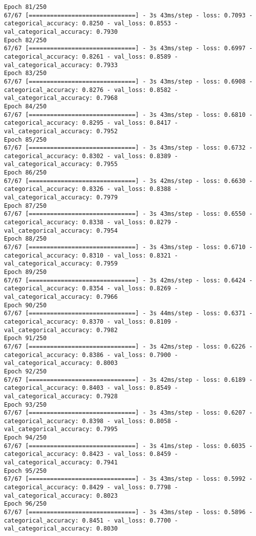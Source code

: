 \begin{lstlisting}
Epoch 81/250
67/67 [==============================] - 3s 43ms/step - loss: 0.7093 - categorical_accuracy: 0.8250 - val_loss: 0.8553 - val_categorical_accuracy: 0.7930
Epoch 82/250
67/67 [==============================] - 3s 43ms/step - loss: 0.6997 - categorical_accuracy: 0.8261 - val_loss: 0.8589 - val_categorical_accuracy: 0.7933
Epoch 83/250
67/67 [==============================] - 3s 43ms/step - loss: 0.6908 - categorical_accuracy: 0.8276 - val_loss: 0.8582 - val_categorical_accuracy: 0.7968
Epoch 84/250
67/67 [==============================] - 3s 43ms/step - loss: 0.6810 - categorical_accuracy: 0.8295 - val_loss: 0.8417 - val_categorical_accuracy: 0.7952
Epoch 85/250
67/67 [==============================] - 3s 43ms/step - loss: 0.6732 - categorical_accuracy: 0.8302 - val_loss: 0.8389 - val_categorical_accuracy: 0.7955
Epoch 86/250
67/67 [==============================] - 3s 42ms/step - loss: 0.6630 - categorical_accuracy: 0.8326 - val_loss: 0.8388 - val_categorical_accuracy: 0.7979
Epoch 87/250
67/67 [==============================] - 3s 43ms/step - loss: 0.6550 - categorical_accuracy: 0.8338 - val_loss: 0.8279 - val_categorical_accuracy: 0.7954
Epoch 88/250
67/67 [==============================] - 3s 43ms/step - loss: 0.6710 - categorical_accuracy: 0.8310 - val_loss: 0.8321 - val_categorical_accuracy: 0.7959
Epoch 89/250
67/67 [==============================] - 3s 42ms/step - loss: 0.6424 - categorical_accuracy: 0.8354 - val_loss: 0.8269 - val_categorical_accuracy: 0.7966
Epoch 90/250
67/67 [==============================] - 3s 44ms/step - loss: 0.6371 - categorical_accuracy: 0.8370 - val_loss: 0.8109 - val_categorical_accuracy: 0.7982
Epoch 91/250
67/67 [==============================] - 3s 42ms/step - loss: 0.6226 - categorical_accuracy: 0.8386 - val_loss: 0.7900 - val_categorical_accuracy: 0.8003
Epoch 92/250
67/67 [==============================] - 3s 42ms/step - loss: 0.6189 - categorical_accuracy: 0.8403 - val_loss: 0.8549 - val_categorical_accuracy: 0.7928
Epoch 93/250
67/67 [==============================] - 3s 43ms/step - loss: 0.6207 - categorical_accuracy: 0.8398 - val_loss: 0.8058 - val_categorical_accuracy: 0.7995
Epoch 94/250
67/67 [==============================] - 3s 41ms/step - loss: 0.6035 - categorical_accuracy: 0.8423 - val_loss: 0.8459 - val_categorical_accuracy: 0.7941
Epoch 95/250
67/67 [==============================] - 3s 43ms/step - loss: 0.5992 - categorical_accuracy: 0.8429 - val_loss: 0.7798 - val_categorical_accuracy: 0.8023
Epoch 96/250
67/67 [==============================] - 3s 43ms/step - loss: 0.5896 - categorical_accuracy: 0.8451 - val_loss: 0.7700 - val_categorical_accuracy: 0.8030

\end{lstlisting}
